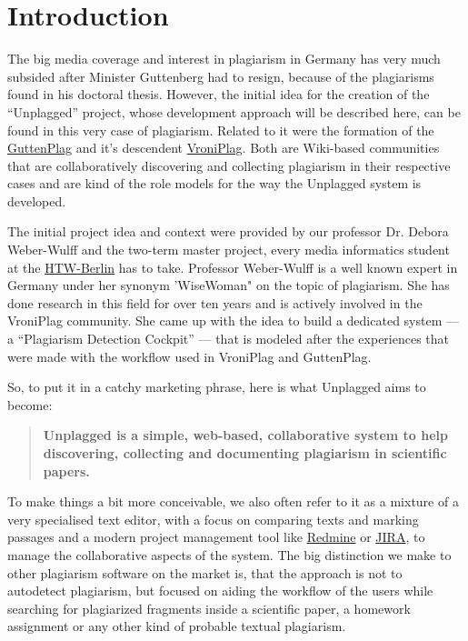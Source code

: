 \chapter*{Introduction}

The big media coverage and interest in plagiarism in Germany has very much subsided 
after Minister Guttenberg had to resign, because of the plagiarisms found in his doctoral thesis\citep{Google2012}. However, the initial idea for the 
creation of the \enquote{Unplagged} project, whose development approach will be described here, can be found in this 
very case of plagiarism. Related to it were the formation of the
\href{http://de.guttenplag.wikia.com/wiki/GuttenPlag\_Wiki}{GuttenPlag} and it's descendent 
\href{http://de.vroniplag.wikia.com/wiki/Home}{VroniPlag}. Both are Wiki-based communities that are collaboratively 
discovering and collecting plagiarism in their respective cases and are kind of the role models for the way the
Unplagged system is developed.

The initial project idea and context were provided by our professor Dr. Debora Weber-Wulff and the two-term master project,
every media informatics student at the \href{http://htw-berlin.de/}{HTW-Berlin} has to take. Professor Weber-Wulff is 
a well known expert in Germany under her synonym 'WiseWoman" on the topic of plagiarism. She has done research in this field for over ten years\citep{Spiegel-Online2011} and is actively involved in the VroniPlag
community. She came up with the idea to build a dedicated system --- a \enquote{Plagiarism Detection Cockpit}\citep{Weber-Wulff2011} --- 
that is modeled after the experiences that were made with the workflow used in VroniPlag and GuttenPlag.

So, to put it in a catchy marketing phrase, here is what Unplagged aims to become: 

\begin{quote}
\textbf{Unplagged is a simple, web-based, collaborative system to help discovering, collecting and 
documenting plagiarism in scientific papers.}
\end{quote}

To make things a bit more conceivable, we also often refer to it as a mixture of a very specialised text editor, with a focus on 
comparing texts and marking 
passages and a modern project management tool like \href{http://www.redmine.org/}{Redmine} or 
\href{http://www.atlassian.com/JIRA}{JIRA}, 
to manage the collaborative aspects of the system. The big distinction we make to other plagiarism software on the market is, 
that the approach is not to autodetect plagiarism, but focused on aiding the workflow of the users while  
searching for plagiarized
fragments inside a scientific paper, a homework assignment or any other kind of probable textual plagiarism.

